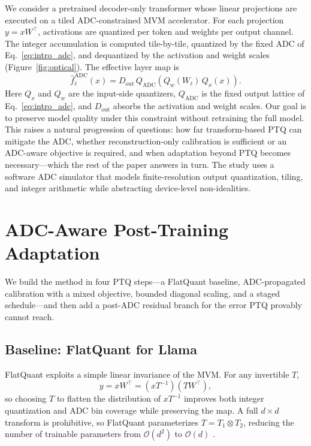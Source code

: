 \documentclass[letterpaper]{article} %
\theoremstyle{plain}
\begin{document}
We consider a pretrained decoder-only transformer whose linear projections are executed on a tiled ADC-constrained MVM accelerator. For each projection $y = xW^\top$, activations are quantized per token and weights per output channel. The integer accumulation is computed tile-by-tile, quantized by the fixed ADC of Eq.~\eqref{eq:intro_adc}, and dequantized by the activation and weight scales (Figure~\ref{fig:optical}). The effective layer map is
\begin{equation}
    \hat{f}^{\mathrm{ADC}}_\ell(x) = D_{\mathrm{out}}\,Q_{\mathrm{ADC}}\!\left(Q_w(W_\ell)\,Q_x(x)\right).
    \label{eq:adc_layer}
\end{equation}
Here $Q_x$ and $Q_w$ are the input-side quantizers, $Q_{\mathrm{ADC}}$ is the fixed output lattice of Eq.~\eqref{eq:intro_adc}, and $D_{\mathrm{out}}$ absorbs the activation and weight scales. Our goal is to preserve model quality under this constraint without retraining the full model. This raises a natural progression of questions: how far transform-based PTQ can mitigate the ADC, whether reconstruction-only calibration is sufficient or an ADC-aware objective is required, and when adaptation beyond PTQ becomes necessary---which the rest of the paper answers in turn. The study uses a software ADC simulator that models finite-resolution output quantization, tiling, and integer arithmetic while abstracting device-level non-idealities.

\section{ADC-Aware Post-Training Adaptation}

We build the method in four PTQ steps---a FlatQuant baseline, ADC-propagated calibration with a mixed objective, bounded diagonal scaling, and a staged schedule---and then add a post-ADC residual branch for the error PTQ provably cannot reach.

\subsection{Baseline: FlatQuant for Llama}

FlatQuant exploits a simple linear invariance of the MVM. For any invertible $T$,
\begin{equation}
    y = xW^{\top} = (xT^{-1})(TW^{\top}),
    \label{eq:flatquant}
\end{equation}
so choosing $T$ to flatten the distribution of $xT^{-1}$ improves both integer quantization and ADC bin coverage while preserving the map. A full $d\times d$ transform is prohibitive, so FlatQuant parameterizes $T = T_1 \otimes T_2$, reducing the number of trainable parameters from $\mathcal{O}(d^2)$ to $\mathcal{O}(d)$ \cite{liu2024flatquant}.
\end{document}
